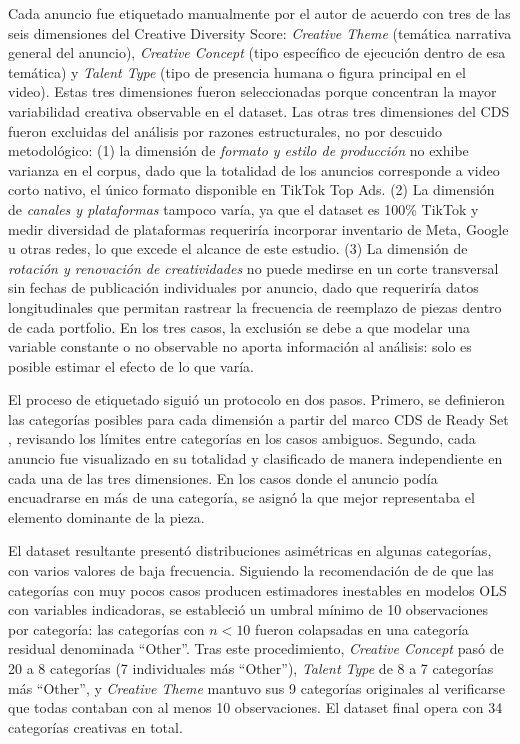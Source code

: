 \documentclass[12pt, a4paper]{report}
\begin{document}
Cada anuncio fue etiquetado manualmente por el autor de acuerdo con tres de las seis dimensiones
del Creative Diversity Score: \textit{Creative Theme} (temática narrativa general del anuncio),
\textit{Creative Concept} (tipo específico de ejecución dentro de esa temática) y \textit{Talent
Type} (tipo de presencia humana o figura principal en el video). Estas tres dimensiones fueron seleccionadas porque concentran la mayor variabilidad
creativa observable en el dataset. Las otras tres dimensiones del CDS fueron excluidas
del análisis por razones estructurales, no por descuido metodológico: (1) la dimensión
de \textit{formato y estilo de producción} no exhibe varianza en el corpus, dado que la
totalidad de los anuncios corresponde a video corto nativo, el único formato disponible
en TikTok Top Ads. (2) La dimensión de \textit{canales y plataformas} tampoco varía,
ya que el dataset es 100\% TikTok y medir diversidad de plataformas requeriría
incorporar inventario de Meta, Google u otras redes, lo que excede el alcance de este
estudio. (3) La dimensión de \textit{rotación y renovación de creatividades} no puede
medirse en un corte transversal sin fechas de publicación individuales por anuncio,
dado que requeriría datos longitudinales que permitan rastrear la frecuencia de
reemplazo de piezas dentro de cada portfolio. En los tres casos, la exclusión se debe
a que modelar una variable constante o no observable no aporta información al análisis:
solo es posible estimar el efecto de lo que varía.

El proceso de etiquetado siguió un protocolo en dos pasos. Primero, se definieron las categorías
posibles para cada dimensión a partir del marco CDS de Ready Set \citep{readyset2025}, revisando
los límites entre categorías en los casos ambiguos. Segundo, cada anuncio fue visualizado en
su totalidad y clasificado de manera independiente en cada una de las tres dimensiones. En los
casos donde el anuncio podía encuadrarse en más de una categoría, se asignó la que mejor
representaba el elemento dominante de la pieza.

El dataset resultante presentó distribuciones asimétricas en algunas categorías, con varios
valores de baja frecuencia. Siguiendo la recomendación de \citet[Cap.~5]{fox2016} de que las
categorías con muy pocos casos producen estimadores inestables en modelos OLS con variables
indicadoras, se estableció un umbral mínimo de 10 observaciones por categoría: las categorías
con $n < 10$ fueron colapsadas en una categoría residual denominada ``Other''. Tras este
procedimiento, \textit{Creative Concept} pasó de 20 a 8 categorías (7 individuales más
``Other''), \textit{Talent Type} de 8 a 7 categorías más ``Other'', y \textit{Creative Theme}
mantuvo sus 9 categorías originales al verificarse que todas contaban con al menos 10
observaciones. El dataset final opera con 34 categorías creativas en total.
\end{document}
